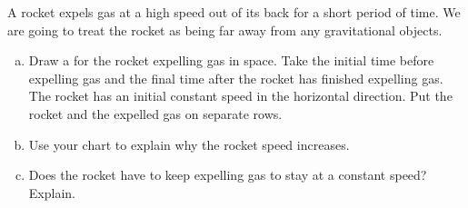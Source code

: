 \label{fnt7.1.1-2}

A rocket expels gas at a high speed out of its back for a short period of time. We are going to treat the rocket as being far away from any gravitational objects.

\begin{enumerate}[(a)]
	\item Draw a \pchart{} for the rocket expelling gas in space. Take the initial time before expelling gas and the final time after the rocket has finished expelling gas. The rocket has an initial constant speed in the horizontal direction. Put the rocket and the expelled gas on separate rows.
	\item Use your chart to explain why the rocket speed increases. 
	\item Does the rocket have to keep expelling gas to stay at a constant speed? Explain.
\end{enumerate}